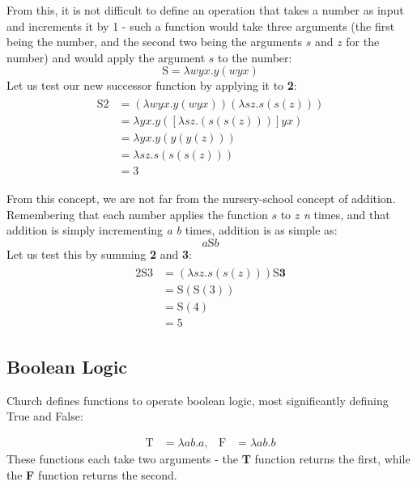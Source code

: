 \documentclass[Master.tex]{subfiles}
\begin{document}
From this, it is not difficult to define an operation that takes a number as input and increments it by 1 - such a function would take three arguments (the first being the number, and the second two being the arguments $s$ and $z$ for the number) and would apply the argument $s$ to the number:
\cite{rojas2015lambdatutorial}
\begin{equation*}
\bm{\mathrm{S}} = \lambda wyx.y(wyx)
\end{equation*}
Let us test our new successor function by applying it to \textbf{2}:
\begin{gather*}
\begin{aligned}
\bm{\mathrm{S2}} &= (\lambda wyx.y(wyx)) (\lambda sz.s(s(z)))\\
&= \lambda yx.y([\lambda sz.(s(s(z)))]yx)\\
&= \lambda yx.y(y(y(z)))\\
&= \lambda sz.s(s(s(z)))\\
&= \bm{\mathrm{3}}
\end{aligned}
\end{gather*}

From this concept, we are not far from the nursery-school concept of addition. Remembering that each number applies the function $s$ to $z$ \textit{n} times, and that addition is simply incrementing \textit{a} \textit{b} times, addition is as simple as:
\cite{rojas2015lambdatutorial}
\begin{equation*}
a\bm{\mathrm{S}}b	
\end{equation*}
Let us test this by summing \textbf{2} and \textbf{3}:
\begin{gather*}
\begin{aligned}
\bm{\mathrm{2S3}} &= (\lambda sz.s(s(z))) \bm{\mathrm{S}} \bm{\textrm{3}}\\
&= \bm{\mathrm{S}} (\bm{\mathrm{S}} (\bm{\mathrm{3}}))\\
&= \bm{\mathrm{S}} (\bm{\mathrm{4}})\\
&= \bm{\mathrm{5}}
\end{aligned}
\end{gather*}

\subsection{Boolean Logic}

Church defines functions to operate boolean logic, most significantly defining True and False:
\cite{rojas2015lambdatutorial}
    
\begin{equation*}
\begin{aligned}
\bm{\mathrm{T}} &= \lambda ab.a,
  & %
\bm{\mathrm{F}} &= \lambda ab.b
\end{aligned}
\end{equation*}
These functions each take two arguments - the \textbf{T} function returns the first, while the \textbf{F} function returns the second.
\end{document}
